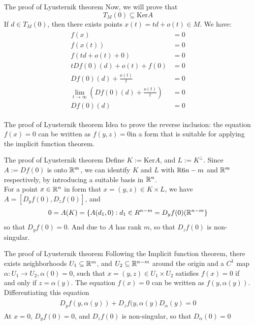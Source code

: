 \begin{frame}{The proof of Lyusternik theorem}
    Now, we will prove that
    \begin{equation}
        T_M(0) \subseteq \text{Ker}A
    \end{equation}
    If $d \in T_M(0)$, then there exists points $x(t) = td + o(t) \in M$. We have:
    \begin{align}
        \begin{aligned}
            f(x) &=0\\
            f(x(t)) & = 0\\
            f(td + o(t) + 0) &= 0\\
            tDf(0)(d) + o(t) + f(0) &= 0\\
            Df(0)(d) + \frac{o(t)}{t} &= 0\\
            \lim_{t \rightarrow \infty}\left(Df(0)(d) + \frac{o(t)}{t}\right) &= 0\\
            Df(0)(d) &= 0
        \end{aligned}
    \end{align}
\end{frame}

\begin{frame}{The proof of Lyusternik theorem}
    Idea to prove the reverse inclusion: the equation $f(x) = 0$ can be written as $f(y,z) = 0$in a form that is suitable for applying the implicit function theorem.
\end{frame}

\begin{frame}{The proof of Lyusternik theorem}
    Define $K:= \text{Ker}A$, and $L := K^{\perp}$. Since $A:= Df(0)$ is onto $\mathbb{R}^m$, we can identify $K$ and $L$ with $\mathbb{R}6{n-m}$ and $\mathbb{R}^m$ respectively, by introducing a suitable basis in $\mathbb{R}^n$.\\
    For a point $x \in \mathbb{R}^n$ in form that $x = (y, z) \in K \times L$, we have $A = [D_yf(0), D_zf(0)]$, and
    \begin{equation}
        0 = A(K) = \{A(d_1, 0) : d_1 \in R^{n-m} = D_yf(0)(\mathbb{R}^{n-m}\}
    \end{equation}
    so that $D_yf(0) = 0$. And due to $A$ has rank $m$, so that $D_zf(0)$ is non-singular.
\end{frame}

\begin{frame}{The proof of Lyusternik theorem}
    Following the Implicit function theorem, there exists neighborhoods $U_1 \subseteq \mathbb{R}^m$, and $U_2 \subseteq \mathbb{R}^{n-m}$ around the origin and a $C^1$ map $\alpha: U_1 \rightarrow U_2, \alpha(0) = 0$, such that $x = (y, z) \in U_1 \times U_2$ satisfies $f(x) = 0$ if and only if $z = \alpha(y)$. The equation $f(x) = 0$ can be written as $f(y, \alpha(y))$. Differentiating this equation
    \begin{align}
        \begin{aligned}
            D_yf(y, \alpha(y)) + D_zf(y, \alpha(y)D_\alpha(y) = 0
        \end{aligned}
    \end{align}
    At $x = 0$, $D_yf(0) = 0$, and $D_zf(0)$ is non-singular, so that $D_\alpha(0) = 0$
\end{frame}

